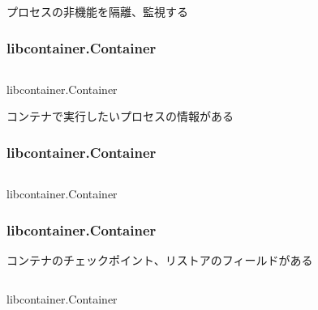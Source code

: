 \documentclass[unicode, 14pt, aspectratio=169]{beamer}
\begin{document}
\begin{frame}[t]
  プロセスの非機能を隔離、監視\supercite{rdt}する
  \frametitle{libcontainer.Container}
  \begin{center}
    \inputminted{go}{code/container2.go}
    libcontainer.Container\supercite{libcontainer}
  \end{center}
\end{frame}
\begin{frame}[t]
  コンテナで実行したいプロセスの情報がある
  \frametitle{libcontainer.Container}
  \begin{center}
    \inputminted{go}{code/container3.go}
    libcontainer.Container\supercite{libcontainer}
  \end{center}
\end{frame}
\begin{frame}[t]
  \frametitle{libcontainer.Container}
  コンテナのチェックポイント、リストアのフィールドがある\supercite{criu}
  \begin{center}
    \inputminted{go}{code/container4.go}
    libcontainer.Container\supercite{libcontainer}
  \end{center}
\end{frame}
\end{document}

